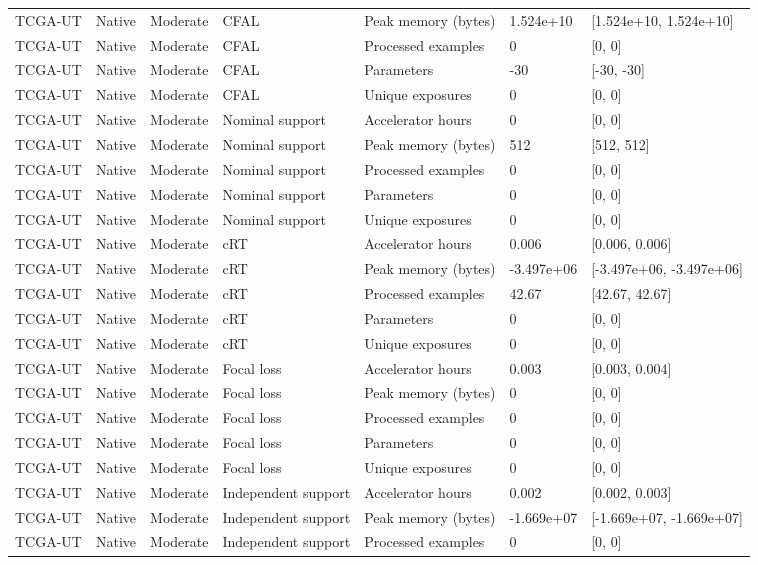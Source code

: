 \begin{longtable}{lllllll}
TCGA-UT & Native & Moderate & CFAL & Peak memory (bytes) & 1.524e+10 & [1.524e+10, 1.524e+10] \\
TCGA-UT & Native & Moderate & CFAL & Processed examples & 0 & [0, 0] \\
TCGA-UT & Native & Moderate & CFAL & Parameters & -30 & [-30, -30] \\
TCGA-UT & Native & Moderate & CFAL & Unique exposures & 0 & [0, 0] \\
TCGA-UT & Native & Moderate & Nominal support & Accelerator hours & 0 & [0, 0] \\
TCGA-UT & Native & Moderate & Nominal support & Peak memory (bytes) & 512 & [512, 512] \\
TCGA-UT & Native & Moderate & Nominal support & Processed examples & 0 & [0, 0] \\
TCGA-UT & Native & Moderate & Nominal support & Parameters & 0 & [0, 0] \\
TCGA-UT & Native & Moderate & Nominal support & Unique exposures & 0 & [0, 0] \\
TCGA-UT & Native & Moderate & cRT & Accelerator hours & 0.006 & [0.006, 0.006] \\
TCGA-UT & Native & Moderate & cRT & Peak memory (bytes) & -3.497e+06 & [-3.497e+06, -3.497e+06] \\
TCGA-UT & Native & Moderate & cRT & Processed examples & 42.67 & [42.67, 42.67] \\
TCGA-UT & Native & Moderate & cRT & Parameters & 0 & [0, 0] \\
TCGA-UT & Native & Moderate & cRT & Unique exposures & 0 & [0, 0] \\
TCGA-UT & Native & Moderate & Focal loss & Accelerator hours & 0.003 & [0.003, 0.004] \\
TCGA-UT & Native & Moderate & Focal loss & Peak memory (bytes) & 0 & [0, 0] \\
TCGA-UT & Native & Moderate & Focal loss & Processed examples & 0 & [0, 0] \\
TCGA-UT & Native & Moderate & Focal loss & Parameters & 0 & [0, 0] \\
TCGA-UT & Native & Moderate & Focal loss & Unique exposures & 0 & [0, 0] \\
TCGA-UT & Native & Moderate & Independent support & Accelerator hours & 0.002 & [0.002, 0.003] \\
TCGA-UT & Native & Moderate & Independent support & Peak memory (bytes) & -1.669e+07 & [-1.669e+07, -1.669e+07] \\
TCGA-UT & Native & Moderate & Independent support & Processed examples & 0 & [0, 0] \\

\end{longtable}
